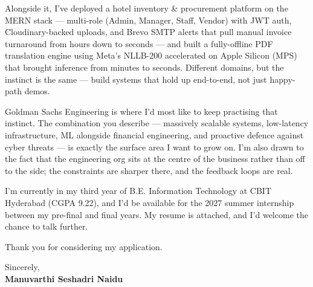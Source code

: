 \documentclass[a4paper,11pt]{article}
\begin{document}
Alongside it, I've deployed a hotel inventory \& procurement platform on the MERN stack --- multi-role (Admin, Manager, Staff, Vendor) with JWT auth, Cloudinary-backed uploads, and Brevo SMTP alerts that pull manual invoice turnaround from hours down to seconds --- and built a fully-offline PDF translation engine using Meta's NLLB-200 accelerated on Apple Silicon (MPS) that brought inference from minutes to seconds. Different domains, but the instinct is the same --- build systems that hold up end-to-end, not just happy-path demos.

Goldman Sachs Engineering is where I'd most like to keep practising that instinct. The combination you describe --- massively scalable systems, low-latency infrastructure, ML alongside financial engineering, and proactive defence against cyber threats --- is exactly the surface area I want to grow on. I'm also drawn to the fact that the engineering org sits at the centre of the business rather than off to the side; the constraints are sharper there, and the feedback loops are real.

I'm currently in my third year of B.E. Information Technology at CBIT Hyderabad (CGPA 9.22), and I'd be available for the 2027 summer internship between my pre-final and final years. My resume is attached, and I'd welcome the chance to talk further.

Thank you for considering my application.

\vspace{12pt}

\noindent Sincerely, \\[10pt]
\textbf{Manuvarthi Seshadri Naidu}
\end{document}
